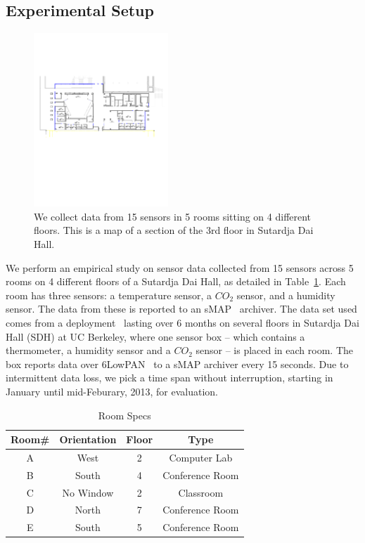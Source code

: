 \subsection{Experimental Setup}
\begin{figure}[h!]
\centering
  \includegraphics[width=0.45\textwidth]{figs/SDH3_crop}
\caption{We collect data from 15 sensors in 5 rooms sitting on 4 different floors. This is a map of a section of the 3rd floor
in Sutardja Dai Hall.}
\label{fig:sdh}
\end{figure}

We perform an empirical study on sensor data collected from 15 sensors across 5 rooms on 4 different floors of a Sutardja Dai Hall, 
as detailed in Table~\ref{table:roomspec}. 
Each room has three sensors: a temperature sensor, a $CO_{2}$ sensor,  and a humidity sensor. 
The data from these is reported to an sMAP~\cite{smap} archiver. The data set used comes from a deployment~\cite{Jay} lasting 
over 6 months on several floors in Sutardja Dai Hall (SDH) at UC Berkeley, where one sensor box -- which contains a thermometer, 
a humidity sensor and a $CO_{2}$ sensor -- is placed in each room. The box reports data over 6LowPAN~\cite{6lowpan} to a sMAP archiver 
every 15 seconds. 
Due to intermittent data loss, we pick a time span without interruption, starting in January until mid-Feburary, 2013, for evaluation.

\begin{table}[ht!]
\caption{Room Specs}
\centering %
\begin{tabular}{c c c c}%
\hline %
Room\# & Orientation & Floor & Type \\ %
\hline\hline %
A & West & 2 & Computer Lab \\ %
B & South & 4 & Conference Room \\
C & No Window & 2 & Classroom \\
D & North & 7 & Conference Room \\
E & South & 5 & Conference Room \\ %
\hline %
\end{tabular}
\label{table:roomspec} %
\end{table}

